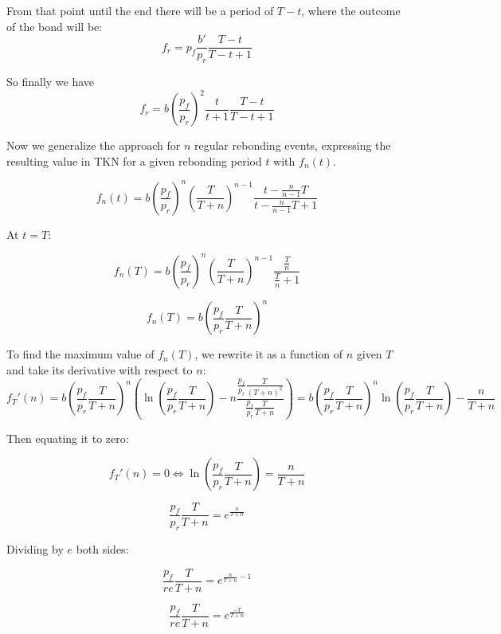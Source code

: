 \documentclass{article}
\begin{document}
From that point until the end there will be a period of $T-t$, where the outcome of the bond will be:
\begin{equation}
f_r = p_f\frac{b'}{p_r}\frac{T-t}{T-t+1}
\end{equation}

So finally we have
\begin{equation}
  \label{eq:o-r}
f_r = b\left(\frac{p_f}{p_r}\right)^2\frac{t}{t+1}\frac{T-t}{T-t+1}
\end{equation}

Now we generalize the approach for $n$ regular rebonding events, expressing the resulting value in TKN for a given rebonding period $t$ with $f_n(t)$.

\begin{equation}
  \label{eq:n-rebond_1}
f_n(t) = b \left(\frac{p_f}{p_r}\right)^n \left(\frac{T}{T+n}\right)^{n-1} \frac{t - \frac{n}{n-1}T}{t - \frac{n}{n-1}T + 1}
\end{equation}

At $t=T$:

\begin{equation}
  \label{eq:n-rebond_2}
f_n(T) = b \left(\frac{p_f}{p_r}\right)^{n} \left(\frac{T}{T+n}\right)^{n-1} \frac{\frac{T}{n}}{\frac{T}{n} + 1}
\end{equation}

\begin{equation}
  \label{eq:n-rebond_3}
f_n(T) = b \left(\frac{p_f}{p_r} \frac{T}{T+n} \right)^{n}
\end{equation}

To find the maximum value of $f_n(T)$, we rewrite it as a function of $n$ given $T$ and take its derivative with respect to $n$:
\[
f_T'(n) = b \left(\frac{p_f}{p_r} \frac{T}{T+n}\right)^n \left(\ln\left(\frac{p_f}{p_r} \frac{T}{T+n}\right) - n \frac{\frac{p_f}{p_r} \frac{T}{(T+n)^2}}{\frac{p_f}{p_r} \frac{T}{T+n}}\right) = b \left(\frac{p_f}{p_r} \frac{T}{T+n}\right)^n \ln\left(\frac{p_f}{p_r} \frac{T}{T+n}\right) - \frac{n}{T+n}
\]

Then equating it to zero:

\[
f_T'(n) = 0 \iff \ln\left(\frac{p_f}{p_r} \frac{T}{T+n}\right) = \frac{n}{T+n}
\]

\[
\frac{p_f}{p_r} \frac{T}{T+n} = e^{\frac{n}{T+n}}
\]

Dividing by $e$ both sides:

\[
\frac{p_f}{re} \frac{T}{T+n} = e^{\frac{n}{T+n} - 1}
\]

\[
\frac{p_f}{re} \frac{T}{T+n} = e^{\frac{-T}{T+n}}
\]
\end{document}
